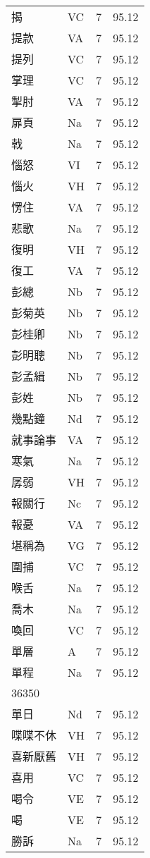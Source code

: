 \documentclass[twocolumn]{book}
\begin{document}
\begin{supertabular}{llrr}
揭 & VC & 7 &  95.12\\
提款 & VA & 7 &  95.12\\
提列 & VC & 7 &  95.12\\
掌理 & VC & 7 &  95.12\\
掣肘 & VA & 7 &  95.12\\
扉頁 & Na & 7 &  95.12\\
戟 & Na & 7 &  95.12\\
惱怒 & VI & 7 &  95.12\\
惱火 & VH & 7 &  95.12\\
愣住 & VA & 7 &  95.12\\
悲歌 & Na & 7 &  95.12\\
復明 & VH & 7 &  95.12\\
復工 & VA & 7 &  95.12\\
彭總 & Nb & 7 &  95.12\\
彭菊英 & Nb & 7 &  95.12\\
彭桂卿 & Nb & 7 &  95.12\\
彭明聰 & Nb & 7 &  95.12\\
彭孟緝 & Nb & 7 &  95.12\\
彭姓 & Nb & 7 &  95.12\\
幾點鐘 & Nd & 7 &  95.12\\
就事論事 & VA & 7 &  95.12\\
寒氣 & Na & 7 &  95.12\\
孱弱 & VH & 7 &  95.12\\
報關行 & Nc & 7 &  95.12\\
報憂 & VA & 7 &  95.12\\
堪稱為 & VG & 7 &  95.12\\
圍捕 & VC & 7 &  95.12\\
喉舌 & Na & 7 &  95.12\\
喬木 & Na & 7 &  95.12\\
喚回 & VC & 7 &  95.12\\
單層 & A & 7 &  95.12\\
單程 & Na & 7 &  95.12\\
36350\\
單日 & Nd & 7 &  95.12\\
喋喋不休 & VH & 7 &  95.12\\
喜新厭舊 & VH & 7 &  95.12\\
喜用 & VC & 7 &  95.12\\
喝令 & VE & 7 &  95.12\\
喝 & VE & 7 &  95.12\\
勝訴 & Na & 7 &  95.12\\

\end{supertabular}
\end{document}

